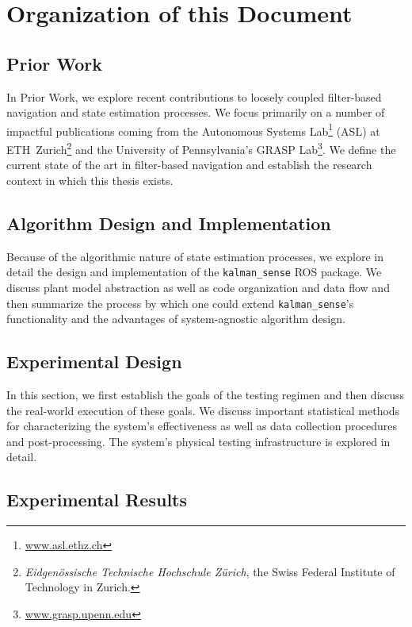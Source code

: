 \section{Organization of this Document}

\subsection*{Prior Work}

In Prior Work, we explore recent contributions to loosely coupled filter-based navigation and state estimation processes. We focus primarily on a number of impactful publications coming from the Autonomous Systems Lab\footnote{\url{www.asl.ethz.ch}} (ASL) at ETH~Zurich\footnote{\textit{Eidgen{\"o}ssische Technische Hochschule Z{\"u}rich}, the Swiss Federal Institute of Technology in Zurich.} and the University of Pennsylvania's GRASP Lab\footnote{\url{www.grasp.upenn.edu}}. We define the current state of the art in filter-based navigation and establish the research context in which this thesis exists.

\subsection*{Algorithm Design and Implementation}

Because of the algorithmic nature of state estimation processes, we explore in detail the design and implementation of the \texttt{kalman\_sense} ROS package. We discuss plant model abstraction as well as code organization and data flow and then summarize the process by which one could extend \texttt{kalman\_sense}'s functionality and the advantages of system-agnostic algorithm design.

\subsection*{Experimental Design}

In this section, we first establish the goals of the testing regimen and then discuss the real-world execution of these goals. We discuss important statistical methods for characterizing the system's effectiveness as well as data collection procedures and post-processing. The system's physical testing infrastructure is explored in detail.

\subsection*{Experimental Results}

